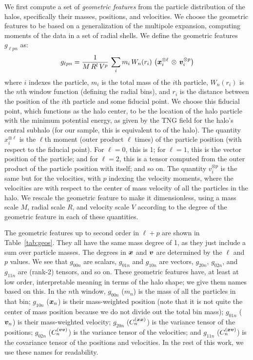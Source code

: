 We first compute a set of \emph{geometric features} from the particle distribution of the \dark halos, specifically their masses, positions, and velocities. 
We choose the geometric features to be based on a generalization of the multipole expansion, computing moments of the data in a set of radial shells. 
We define the geometric features $g_{\ell p n}$ as: 
\label{eq:geo}
\begin{equation}
    g_{\ell p n} = \frac{1}{M \, R^l \, V^p} \, \sum_i m_i \, W_n(r_i) \, \left( \bm{x}_i^{\otimes \ell} \, \otimes \, \bm{v}_i^{\otimes p} \right)
\end{equation}
where $i$ indexes the particle, $m_i$ is the total mass of the $i$th particle, $W_n(r_i)$ is the $n$th window function (defining the radial bins), and $r_i$ is the distance between the position of the $i$th particle and some fiducial point.
We choose this fiducial point, which functions as the halo center, to be the location of the halo particle with the minimum potential energy, as given by the TNG field  for the halo's central subhalo (for our sample, this is equivalent to  of the \dark halo).
The quantity $x_i^{\otimes \ell}$ is the $\ell$th moment (outer product $\ell$ times) of the particle position (with respect to the fiducial point).
For $\ell = 0$, this is 1; for $\ell = 1$, this is the vector position of the particle; and for $\ell = 2$, this is a tensor computed from the outer product of the particle position with itself; and so on.
The quantity $v_i^{\otimes p}$ is the same but for the velocities, with $p$ indexing the velocity moments, where the velocities are with respect to the center of mass velocity of all the particles in the halo.
We rescale the geometric feature to make it dimensionless, using a mass scale $M$, radial scale $R$, and velocity scale $V$ according to the degree of the geometric feature in each of these quantities.

The geometric features up to second order in $\ell + p$ are shown in Table~\ref{tab:geos}.
They all have the same mass degree of 1, as they just include a sum over particle masses.
The degrees in $\bm{x}$ and $\bm{v}$ are determined by the $\ell$ and $p$ values.
We see that $g_{00n}$ are scalars, $g_{01n}$ and $g_{10n}$ are vectors, $g_{20n}$, $g_{02n}$, and $g_{11n}$ are (rank-2) tensors, and so on.
These geometric features have, at least at low order, interpretable meaning in terms of the halo shape; we give them names based on this.
In the $n$th window, $g_{00n}$ ($m_n$) is the mass of all the particles in that bin; $g_{10n}$ ($\bm{x}_n$) is their mass-weighted position (note that it is not quite the center of mass position because we do not divide out the total bin mass); $g_{01n}$ ($\bm{v}_n$) is their mass-weighted velocity; $g_{20n}$ ($C^{(\bm{x}\bm{x})}_n$) is the variance tensor of the positions; $g_{02n}$ ($C^{(\bm{v}\bm{v})}_n$) is the variance tensor of the velocities; and $g_{11n}$ ($C^{(\bm{x}\bm{v})}_n$) is the covariance tensor of the positions and velocities.
In the rest of this work, we use these names for readability.

